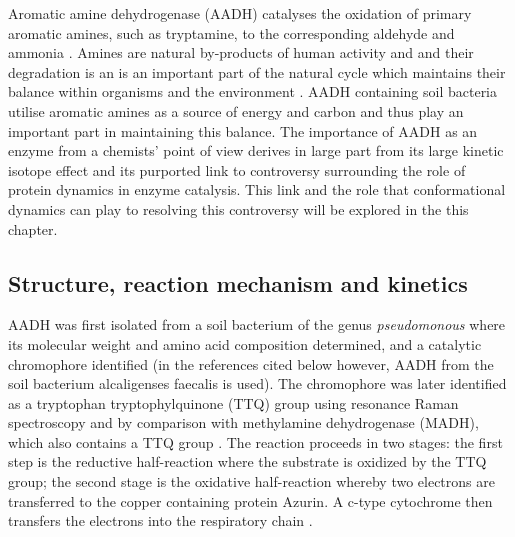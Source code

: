 Aromatic amine dehydrogenase (AADH) catalyses the oxidation of primary aromatic amines, such as tryptamine, to the corresponding aldehyde and ammonia \cite{masgrauAtomicDescriptionEnzyme2006}. Amines are natural by-products of human activity and and their degradation is an is an important part of the natural cycle which maintains their balance within organisms and the environment \cite{chistoserdovCloningSequencingMutagenesis2001}. AADH containing soil bacteria utilise aromatic amines as a source of energy and carbon \cite{govindarajAromaticAmineDehydrogenase1994a} and thus play an important part in maintaining this balance. The importance of AADH as an enzyme from a chemists' point of view derives in large part from its large kinetic isotope effect and its purported link to controversy surrounding the role of protein dynamics in enzyme catalysis. This link and the role that conformational dynamics can play to resolving this controversy will be explored in the this chapter. 


\subsection{Structure, reaction mechanism and kinetics} 

AADH was first isolated from a soil bacterium of the genus \emph{pseudomonous}  where its molecular weight and amino acid composition determined, and a catalytic chromophore identified \cite{iwakiCrystallizationPropertiesAromatic1983} (in the references cited below however, AADH from the soil bacterium alcaligenses faecalis is used).  The chromophore was later identified as a tryptophan tryptophylquinone (TTQ) group using resonance Raman spectroscopy and by comparison with methylamine dehydrogenase (MADH), which also contains a TTQ group \cite{govindarajAromaticAmineDehydrogenase1994a}.  The reaction proceeds in two stages: the first step is the reductive half-reaction where the substrate is oxidized by the TTQ group; the second stage is the oxidative half-reaction whereby two electrons are transferred to the copper containing protein Azurin. A c-type cytochrome then transfers the electrons into the respiratory chain \cite{masgrauAtomicDescriptionEnzyme2006}. 

